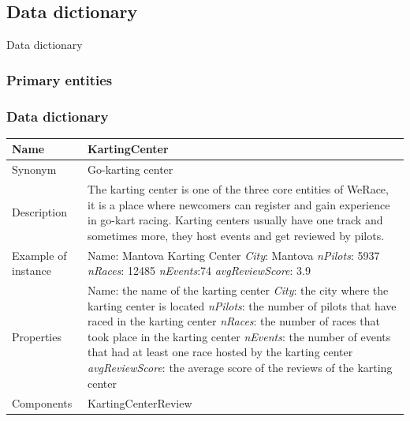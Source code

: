 \documentclass{beamer}
\newcommand{\kc}{WeRace}
\begin{document}



\subsection{Data dictionary}

\begin{frame}{Data dictionary}

\end{frame}

\subsubsection{Primary entities}

\begin{frame}
\frametitle{Data dictionary}


\begin{table}
\tiny
\begin{tabular}{|p{2cm}|p{6cm}|}
\hline
Name & \textbf{KartingCenter} \\
\hline
Synonym & Go-karting center \\
\hline
Description & The karting center is one of the three core entities of \kc{},
it is a place where newcomers can register and gain experience in go-kart racing.
Karting centers usually have one track and sometimes more, they host events and 
get reviewed by pilots. \\
\hline
Example of instance & 
Name: Mantova Karting Center \newline
\textit{City}: Mantova \newline
\textit{nPilots}: 5937 \newline
\textit{nRaces}: 12485 \newline
\textit{nEvents}:74 \newline
\textit{avgReviewScore}: 3.9 \\
\hline
Properties & 
Name: the name of the karting center\newline
\textit{City}: the city where the karting center is located\newline
\textit{nPilots}: the number of pilots that have raced in the karting center \newline
\textit{nRaces}: the number of races that took place in the karting center \newline
\textit{nEvents}: the number of events that had at least one race hosted by the karting center \newline
\textit{avgReviewScore}: the average score of the reviews of the karting center \\
\hline
Components & KartingCenterReview \\
\hline
\end{tabular}
\end{table}

\end{frame}
\end{document}
